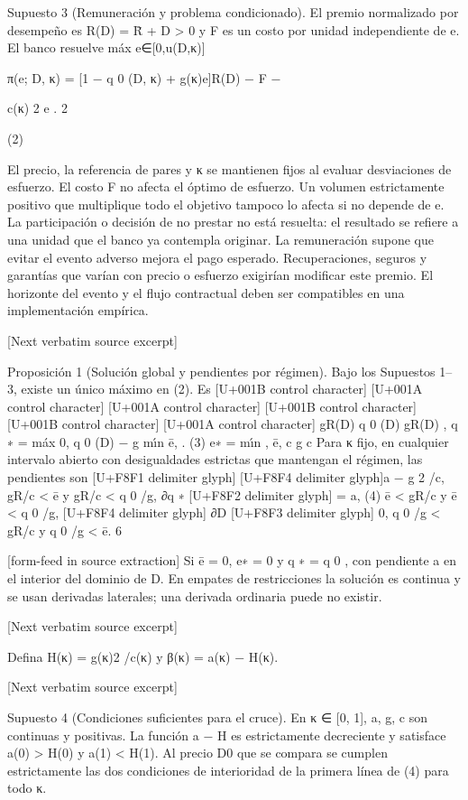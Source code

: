 \documentclass[10pt]{article}
\begin{document}
\begin{ReviewVerbatim}

Supuesto 3 (Remuneración y problema condicionado). El premio normalizado por desempeño es
R(D) = R̄ + D > 0 y F es un costo por unidad independiente de e. El banco resuelve
máx
e∈[0,u(D,κ)]

π(e; D, κ) = [1 − q 0 (D, κ) + g(κ)e]R(D) − F −

c(κ) 2
e .
2

(2)

El precio, la referencia de pares y κ se mantienen ﬁjos al evaluar desviaciones de esfuerzo.
El costo F no afecta el óptimo de esfuerzo. Un volumen estrictamente positivo que multiplique
todo el objetivo tampoco lo afecta si no depende de e. La participación o decisión de no prestar
no está resuelta: el resultado se reﬁere a una unidad que el banco ya contempla originar. La remuneración supone que evitar el evento adverso mejora el pago esperado. Recuperaciones, seguros y
garantías que varían con precio o esfuerzo exigirían modiﬁcar este premio. El horizonte del evento
y el ﬂujo contractual deben ser compatibles en una implementación empírica.

[Next verbatim source excerpt]

Proposición 1 (Solución global y pendientes por régimen). Bajo los Supuestos 1–3, existe un
único máximo en (2). Es
[U+001B control character]
[U+001A control character]
[U+001A control character]
[U+001B control character][U+001B control character]
[U+001A control character]
gR(D)
q 0 (D)
gR(D)
,
q ∗ = máx 0, q 0 (D) − g mı́n ē,
.
(3)
e∗ = mı́n
, ē,
c
g
c
Para κ ﬁjo, en cualquier intervalo abierto con desigualdades estrictas que mantengan el régimen,
las pendientes son
[U+F8F1 delimiter glyph]
[U+F8F4 delimiter glyph]a − g 2 /c, gR/c < ē y gR/c < q 0 /g,
∂q ∗ [U+F8F2 delimiter glyph]
= a,
(4)
ē < gR/c y ē < q 0 /g,
[U+F8F4 delimiter glyph]
∂D
[U+F8F3 delimiter glyph]
0,
q 0 /g < gR/c y q 0 /g < ē.
6


[form-feed in source extraction]
Si ē = 0, e∗ = 0 y q ∗ = q 0 , con pendiente a en el interior del dominio de D. En empates de
restricciones la solución es continua y se usan derivadas laterales; una derivada ordinaria puede
no existir.

[Next verbatim source excerpt]

Deﬁna H(κ) = g(κ)2 /c(κ) y β(κ) = a(κ) − H(κ).

[Next verbatim source excerpt]

Supuesto 4 (Condiciones suﬁcientes para el cruce). En κ ∈ [0, 1], a, g, c son continuas y positivas.
La función a − H es estrictamente decreciente y satisface a(0) > H(0) y a(1) < H(1). Al precio D0
que se compara se cumplen estrictamente las dos condiciones de interioridad de la primera línea de
(4) para todo κ.
\end{ReviewVerbatim}
\end{document}
